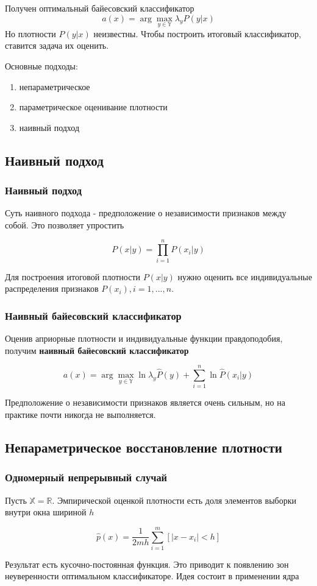 \documentclass{beamer}
\begin{document}
	\begin{frame}
		\frametitle{}
		Получен оптимальный байесовский классификатор
		\[
		a(x) = \arg \max_{y \in \mathbb{Y}} \lambda_{y} P(y | x)
		\]
		Но плотности $P(y | x)$ неизвестны. Чтобы построить итоговый классификатор, ставится задача их оценить.
		
		\vspace{5pt}
		Основные подходы:
		\begin{enumerate}
			\item непараметрическое
			\item параметрическое оценивание плотности
			\item наивный подход
		\end{enumerate}
 		
	\end{frame}
	
	\subsection{Наивный подход}
	
	\begin{frame}
		\frametitle{Наивный подход}
		Суть наивного подхода - предположение о независимости признаков между собой.
		Это позволяет упростить
		
		\[
		P(x | y) = \prod_{i=1}^{n} P(x_i | y)
		\]
		
		Для построения итоговой плотности $P(x | y)$ нужно оценить все индивидуальные распределения признаков $P(x_i), i=1, ..., n$.
	\end{frame}
	
	\begin{frame}
		\frametitle{Наивный байесовский классификатор}
		Оценив априорные плотности и индивидуальные функции правдоподобия, получим \textbf{наивный байесовский классификатор}
		
		\[
		a(x) = \arg \max_{y \in \mathbb{Y}} \ln \lambda_{y} \hat{P}(y) + \sum_{i=1}^{n} \ln \hat{P}(x_i | y)
		\]
		
		Предположение о независимости признаков является очень сильным, но на практике почти никогда не выполняется. 
	\end{frame}
	
	\subsection{Непараметрическое восстановление плотности}
	
	\begin{frame}
		\frametitle{Одномерный непрерывный случай}
		Пусть $\mathbb{X} = \mathbb{R}$. 
		Эмпирической оценкой плотности есть доля элементов выборки внутри окна шириной $h$
		
		\[
		\hat{p}(x) = \frac{1}{2mh} \sum_{i=1}^{m} [|x - x_i| < h]
		\]
		
		Результат есть кусочно-постоянная функция. Это приводит к появлению зон неуверенности оптимальном классификаторе. Идея состоит в применении ядра
	\end{frame}
	
\end{document}
